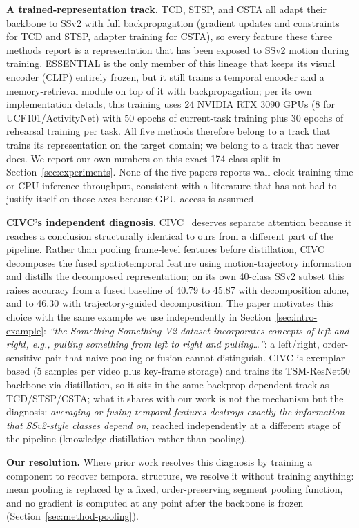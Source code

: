 \documentclass[a4paper,fleqn]{cas-dc}
\begin{document}
\textbf{A trained-representation track.} TCD, STSP, and CSTA all adapt their backbone to SSv2 with full
backpropagation (gradient updates and constraints for TCD and STSP, adapter
training for CSTA), so every feature these three methods report is a
representation that has been exposed to SSv2 motion during training.
ESSENTIAL is the only member of this lineage that keeps its visual encoder
(CLIP) entirely frozen, but it still trains a temporal encoder and a
memory-retrieval module on top of it with backpropagation; per its own
implementation details, this training uses 24 NVIDIA RTX 3090 GPUs (8 for
UCF101/ActivityNet) with 50 epochs of current-task training plus 30 epochs
of rehearsal training per task. All five methods therefore belong to a track
that trains its representation on the target domain; we belong to a track
that never does. We report our own numbers on this exact 174-class split in
Section~\ref{sec:experiments}. None of the five papers reports wall-clock training time
or CPU inference throughput, consistent with a literature that has not had
to justify itself on those axes because GPU access is assumed.

\textbf{CIVC's independent diagnosis.} CIVC~\cite{zhao2021civc}
deserves separate attention because it reaches a conclusion structurally
identical to ours from a different part of the pipeline. Rather than pooling
frame-level features before distillation, CIVC decomposes the fused
spatiotemporal feature using motion-trajectory information and distills the
decomposed representation; on its own 40-class SSv2 subset this raises
accuracy from a fused baseline of 40.79 to 45.87 with decomposition alone,
and to 46.30 with trajectory-guided decomposition. The paper motivates this
choice with the same example we use independently in
Section~\ref{sec:intro-example}: \emph{``the Something-Something V2 dataset
incorporates concepts of left and right, e.g., pulling something from left
to right and pulling\ldots''}: a left/right, order-sensitive pair that
naive pooling or fusion cannot distinguish. CIVC is exemplar-based (5
samples per video plus key-frame storage) and trains its TSM-ResNet50
backbone via distillation, so it sits in the same backprop-dependent track
as TCD/STSP/CSTA; what it shares with our work is not the mechanism but the
diagnosis: \emph{averaging or fusing temporal features destroys exactly the
information that SSv2-style classes depend on}, reached independently at a
different stage of the pipeline (knowledge distillation rather than
pooling).

\textbf{Our resolution.} Where prior work resolves this diagnosis by training a component to recover
temporal structure, we resolve it without training anything: mean pooling
is replaced by a fixed, order-preserving segment pooling function, and no
gradient is computed at any point after the backbone is frozen
(Section~\ref{sec:method-pooling}).
\end{document}
